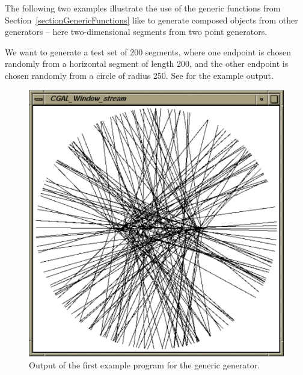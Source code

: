 The following two examples illustrate the use of the generic functions
from Section~\ref{sectionGenericFunctions} like
%
 to generate 
composed objects from other
generators -- here two-dimensional segments from two point generators.

We want to generate a test set of 200 segments, where one endpoint is
chosen randomly from a horizontal segment of length 200, and the other
endpoint is chosen randomly from a circle of radius 250. See
 for the example
output.

\begin{ccTexOnly}
  \begin{figure}
    \noindent
    \hspace*{0.025\textwidth}%
    \begin{minipage}[t]{0.45\textwidth}%
      \includegraphics[width=\textwidth]{Generator/Segment_generator_prog1}
      \caption{Output of the first example program for the generic generator.}
      \label{figureSegmentGenerator}
    \end{minipage}%
    \hspace*{0.05\textwidth}%

\end{figure}
\end{ccTexOnly}
